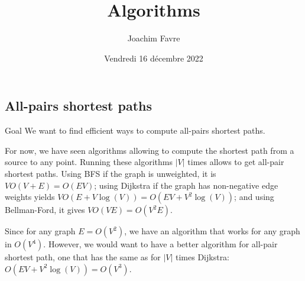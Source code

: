 \documentclass[a4paper]{article}
\title{Algorithms}
\author{Joachim Favre}
\date{Vendredi 16 décembre 2022}
\begin{document}
\maketitle


\subsection{All-pairs shortest paths}
\begin{parag}{Goal}
    We want to find efficient ways to compute all-pairs shortest paths.

    For now, we have seen algorithms allowing to compute the shortest path from a source to any point. Running these algorithms $\left|V\right|$ times allows to get all-pair shortest paths. Using BFS if the graph is unweighted, it is $VO\left(V + E\right) = O\left(EV\right)$; using Dijkstra if the graph has non-negative edge weights yields $VO\left(E + V\log\left(V\right)\right) = O\left(EV + V^2 \log\left(V\right)\right)$; and using Bellman-Ford, it gives $VO\left(VE\right) = O\left(V^2 E\right)$.

    Since for any graph $E = O\left(V^2\right)$, we have an algorithm that works for any graph in $O\left(V^4\right)$. However, we would want to have a better algorithm for all-pair shortest path, one that has the same as for $\left|V\right|$ times Dijkstra: $O\left(EV + V^2 \log\left(V\right)\right) = O\left(V^3\right)$.
\end{parag}
\end{document}
